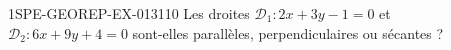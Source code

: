 \begin{exercice}{1SPE-GEOREP-EX-013}{1}{10}
Les droites $\mathcal{D}_1 : 2x + 3y - 1 = 0$ et $\mathcal{D}_2 : 6x + 9y + 4 = 0$ sont-elles parallèles, perpendiculaires ou sécantes ?
\end{exercice}
